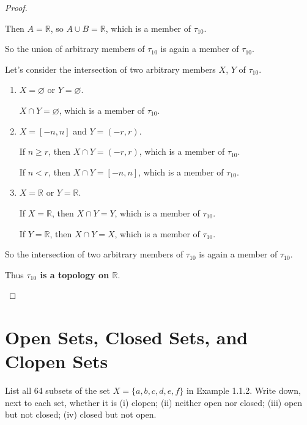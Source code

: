 \begin{proof}
\begin{enumerate}[label={(\roman*)}]
\begin{enumerate}[label={\textbf{Case \arabic*.}},itemindent=1cm]
                        Then $A = \mathbb{R}$, so $A\cup B = \mathbb{R}$, which is a member of $\tau_{10}$.
              \end{enumerate}

              So the union of arbitrary members of $\tau_{10}$ is again a member of $\tau_{10}$.

              Let's consider the intersection of two arbitrary members $X$, $Y$ of $\tau_{10}$.
              \begin{enumerate}[label={\textbf{Case \arabic*.}},itemindent=1cm]
                  \item $X = \varnothing$ or $Y = \varnothing$.

                        $X\cap Y = \varnothing$, which is a member of $\tau_{10}$.
                  \item $X = [-n, n]$ and $Y = (-r, r)$.

                        If $n\geq r$, then $X\cap Y = (-r, r)$, which is a member of $\tau_{10}$.

                        If $n < r$, then $X\cap Y = [-n, n]$, which is a member of $\tau_{10}$.
                  \item $X = \mathbb{R}$ or $Y = \mathbb{R}$.

                        If $X = \mathbb{R}$, then $X\cap Y = Y$, which is a member of $\tau_{10}$.

                        If $Y = \mathbb{R}$, then $X\cap Y = X$, which is a member of $\tau_{10}$.
              \end{enumerate}

              So the intersection of two arbitrary members of $\tau_{10}$ is again a member of $\tau_{10}$.

              Thus \textbf{$\tau_{10}$ is a topology on $\mathbb{R}$}.
    \end{enumerate}
\end{proof}
\newpage

\section{Open Sets, Closed Sets, and Clopen Sets}

\begin{exercise}
    List all 64 subsets of the set $X = \{ a, b, c, d, e, f \}$ in Example 1.1.2. Write down, next to each set, whether it is (i) clopen; (ii) neither open nor closed; (iii) open but not closed; (iv) closed but not open.
\end{exercise}

